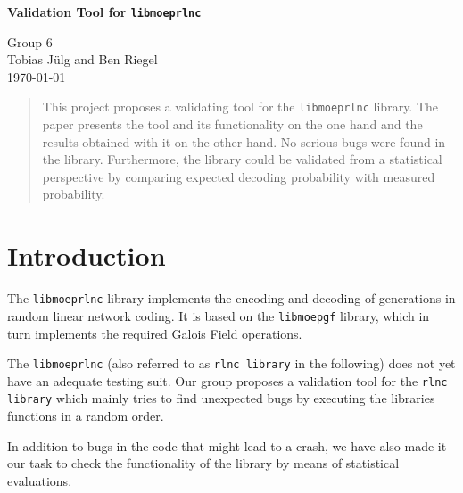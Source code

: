 \documentclass[a4paper,english,10pt]{tumarticle}
\begin{document}
\begin{center}
	\bfseries\Large Validation Tool for \texttt{libmoeprlnc}\\[.5\baselineskip]
\end{center}
\begin{center}
	\large Group 6\\\vspace{0.5cm}
	\small Tobias Jülg and Ben Riegel\\%
	\today
\end{center}


\setcounter{tocdepth}{1}
\renewcommand{\contentsname}{Anlagen}

\renewcommand{\emph}[1]{%
	\textcolor{TUMBlue}{#1}%
}


\renewcommand{\abstractname}{Abstract}
\begin{abstract}
\setlength{\parindent}{0pt}
\noindent%
\footnotesize

This project proposes a validating tool for the \texttt{libmoeprlnc} library. 
The paper presents the tool and its functionality on the one hand and the results 
obtained with it on the other hand. No serious bugs were found in the library. Furthermore, 
the library could be validated from a statistical perspective by comparing expected decoding 
probability with measured probability.

\end{abstract}

\section{Introduction}

The \texttt{libmoeprlnc} library implements the encoding and decoding of generations in
random linear network coding. It is based on the \texttt{libmoepgf} library, which in turn
implements the required Galois Field operations.

The \texttt{libmoeprlnc} (also referred to as \texttt{rlnc library} in the following) does not yet have an 
adequate testing suit. Our group proposes a validation tool for the \texttt{rlnc library} which mainly tries to 
find unexpected bugs by executing the libraries functions in a random order.

In addition to bugs in the code that might lead to a crash, we have also made it our task to check the functionality 
of the library by means of statistical evaluations.
\end{document}
